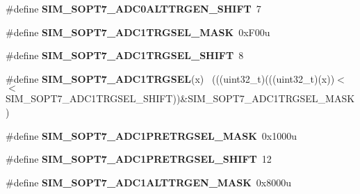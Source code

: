 \begin{DoxyCompactItemize}
\item 
\hypertarget{group___s_i_m___register___masks_gaa20ed5f5ab9cf02714a993c3996adcc5}{}\#define {\bfseries S\+I\+M\+\_\+\+S\+O\+P\+T7\+\_\+\+A\+D\+C0\+A\+L\+T\+T\+R\+G\+E\+N\+\_\+\+S\+H\+I\+F\+T}~7\label{group___s_i_m___register___masks_gaa20ed5f5ab9cf02714a993c3996adcc5}

\item 
\hypertarget{group___s_i_m___register___masks_ga1c262a802f5341d2b3f9e3750fec1244}{}\#define {\bfseries S\+I\+M\+\_\+\+S\+O\+P\+T7\+\_\+\+A\+D\+C1\+T\+R\+G\+S\+E\+L\+\_\+\+M\+A\+S\+K}~0x\+F00u\label{group___s_i_m___register___masks_ga1c262a802f5341d2b3f9e3750fec1244}

\item 
\hypertarget{group___s_i_m___register___masks_ga41e9a42e300b2132d8877fb9a01a6fa1}{}\#define {\bfseries S\+I\+M\+\_\+\+S\+O\+P\+T7\+\_\+\+A\+D\+C1\+T\+R\+G\+S\+E\+L\+\_\+\+S\+H\+I\+F\+T}~8\label{group___s_i_m___register___masks_ga41e9a42e300b2132d8877fb9a01a6fa1}

\item 
\hypertarget{group___s_i_m___register___masks_gaf9d90181fb7f7b1689b6835b5abf693f}{}\#define {\bfseries S\+I\+M\+\_\+\+S\+O\+P\+T7\+\_\+\+A\+D\+C1\+T\+R\+G\+S\+E\+L}(x)                                ~(((uint32\+\_\+t)(((uint32\+\_\+t)(x))$<$$<$S\+I\+M\+\_\+\+S\+O\+P\+T7\+\_\+\+A\+D\+C1\+T\+R\+G\+S\+E\+L\+\_\+\+S\+H\+I\+F\+T))\&S\+I\+M\+\_\+\+S\+O\+P\+T7\+\_\+\+A\+D\+C1\+T\+R\+G\+S\+E\+L\+\_\+\+M\+A\+S\+K)\label{group___s_i_m___register___masks_gaf9d90181fb7f7b1689b6835b5abf693f}

\item 
\hypertarget{group___s_i_m___register___masks_gad5a05f77e88118ff1b5c02e4a756f527}{}\#define {\bfseries S\+I\+M\+\_\+\+S\+O\+P\+T7\+\_\+\+A\+D\+C1\+P\+R\+E\+T\+R\+G\+S\+E\+L\+\_\+\+M\+A\+S\+K}~0x1000u\label{group___s_i_m___register___masks_gad5a05f77e88118ff1b5c02e4a756f527}

\item 
\hypertarget{group___s_i_m___register___masks_ga8cf171203a65ae7c3842b32a90562558}{}\#define {\bfseries S\+I\+M\+\_\+\+S\+O\+P\+T7\+\_\+\+A\+D\+C1\+P\+R\+E\+T\+R\+G\+S\+E\+L\+\_\+\+S\+H\+I\+F\+T}~12\label{group___s_i_m___register___masks_ga8cf171203a65ae7c3842b32a90562558}

\item 
\hypertarget{group___s_i_m___register___masks_ga784f68293064986f91f7a6221a67ed14}{}\#define {\bfseries S\+I\+M\+\_\+\+S\+O\+P\+T7\+\_\+\+A\+D\+C1\+A\+L\+T\+T\+R\+G\+E\+N\+\_\+\+M\+A\+S\+K}~0x8000u\label{group___s_i_m___register___masks_ga784f68293064986f91f7a6221a67ed14}


\end{DoxyCompactItemize}
